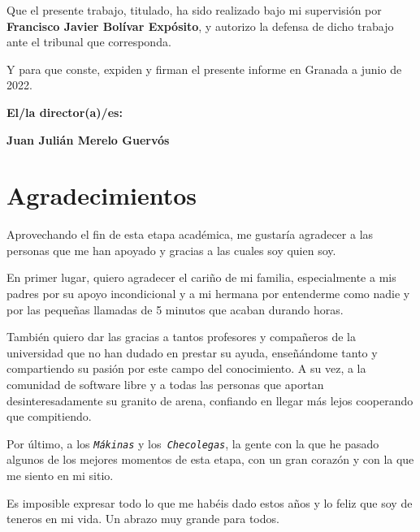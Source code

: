 \vspace{0.5cm}

Que el presente trabajo, titulado\texttt{},
ha sido realizado bajo mi supervisión por \textbf{Francisco Javier Bolívar Expósito}, y autorizo la defensa de dicho trabajo ante el tribunal
que corresponda.

\vspace{0.5cm}

Y para que conste, expiden y firman el presente informe en Granada a junio de 2022.

\vspace{1cm}

\textbf{El/la director(a)/es: }

\vspace{5cm}

\noindent \textbf{Juan Julián Merelo Guervós}

\chapter*{Agradecimientos}

Aprovechando el fin de esta etapa académica, me gustaría agradecer a las personas que me han apoyado y gracias a las cuales soy quien soy.

En primer lugar, quiero agradecer el cariño de mi familia, especialmente a mis padres por su apoyo incondicional y a mi hermana por entenderme como nadie y por las pequeñas llamadas de 5 minutos que acaban durando horas.

También quiero dar las gracias a tantos profesores y compañeros de la universidad que no han dudado en prestar su ayuda, enseñándome tanto y compartiendo su pasión por este campo del conocimiento. A su vez, a la comunidad de software libre y a todas las personas que aportan desinteresadamente su granito de arena, confiando en llegar más lejos cooperando que compitiendo. 

Por último, a los \texttt{\normalfont\textit{Mákinas}} y los\texttt{\normalfont\textit{ Checolegas}}, la gente con la que he pasado algunos de los mejores momentos de esta etapa, con un gran corazón y con la que me siento en mi sitio.

Es imposible expresar todo lo que me habéis dado estos años y lo feliz que soy de teneros en mi vida. Un abrazo muy grande para todos.

\vspace*{1cm}

